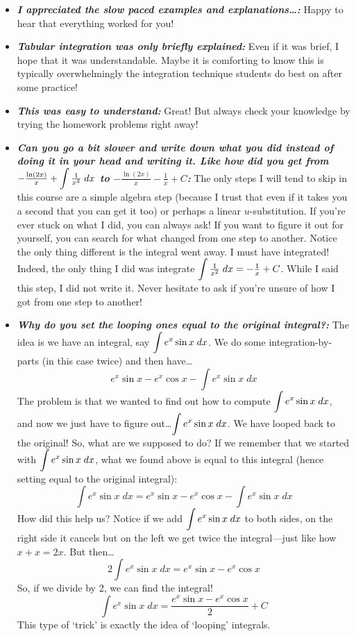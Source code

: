 \documentclass[11pt,letterpaper]{article}
\begin{document}
\begin{itemize}
\item {\bfseries\itshape I appreciated the slow paced examples and explanations\dots:} Happy to hear that everything worked for you!

\item {\bfseries\itshape Tabular integration was only briefly explained:} Even if it was brief, I hope that it was understandable. Maybe it is comforting to know this is typically overwhelmingly the integration technique students do best on after some practice!

\item {\bfseries\itshape This was easy to understand:} Great! But always check your knowledge by trying the homework problems right away!

\item {\bfseries\itshape Can you go a bit slower and write down what you did instead of doing it in your head and writing it. Like how did you get from $\displaystyle -\tfrac{\ln(2x)}{x} + \int \tfrac{1}{x^2} \;dx$ to $-\tfrac{\ln(2x)}{x} - \tfrac{1}{x} + C$:} The only steps I will tend to skip in this course are a simple algebra step (because I trust that even if it takes you a second that you can get it too) or perhaps a linear $u$-substitution. If you're ever stuck on what I did, you can always ask! If you want to figure it out for yourself, you can search for what changed from one step to another. Notice the only thing different is the integral went away. I must have integrated! Indeed, the only thing I did was integrate $\displaystyle\int \tfrac{1}{x^2} \;dx= -\tfrac{1}{x} + C$. While I said this step, I did not write it. Never hesitate to ask if you're unsure of how I got from one step to another!

\item {\bfseries\itshape Why do you set the looping ones equal to the original integral?:} The idea is we have an integral, say $\displaystyle\int e^x \sin x \;dx$. We do some integration-by-parts (in this case twice) and then have\dots
	\[
	e^x \sin x - e^x \cos x - \int e^x \sin x \;dx
	\]
The problem is that we wanted to find out how to compute $\displaystyle\int e^x \sin x \;dx$, and now we just have to figure out\dots $\displaystyle\int e^x \sin x \;dx$. We have looped back to the original! So, what are we supposed to do? If we remember that we started with $\displaystyle\int e^x \sin x \;dx$, what we found above is equal to this integral (hence setting equal to the original integral):
	\[
	\int e^x \sin x \;dx= e^x \sin x - e^x \cos x - \int e^x \sin x \;dx
	\]
How did this help us? Notice if we add $\displaystyle\int e^x \sin x \;dx$ to both sides, on the right side it cancels but on the left we get twice the integral---just like how $x + x= 2x$. But then\dots
	\[
	2\int e^x \sin x \;dx= e^x \sin x - e^x \cos x
	\]
So, if we divide by 2, we can find the integral!
	\[
	\int e^x \sin x \;dx= \dfrac{e^x \sin x - e^x \cos x}{2} + C
	\]
This type of `trick' is exactly the idea of `looping' integrals. 


\end{itemize}
\end{document}
